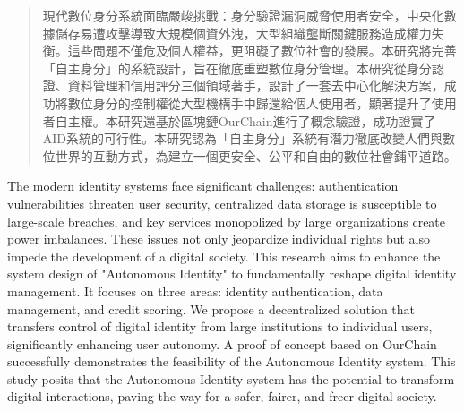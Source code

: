 
\begin{abstract}
  現代數位身分系統面臨嚴峻挑戰：身分驗證漏洞威脅使用者安全，中央化數據儲存易遭攻擊導致大規模個資外洩，大型組織壟斷關鍵服務造成權力失衡。這些問題不僅危及個人權益，更阻礙了數位社會的發展。本研究將完善「自主身分」的系統設計，旨在徹底重塑數位身分管理。本研究從身分認證、資料管理和信用評分三個領域著手，設計了一套去中心化解決方案，成功將數位身分的控制權從大型機構手中歸還給個人使用者，顯著提升了使用者自主權。本研究還基於區塊鏈OurChain進行了概念驗證，成功證實了AID系統的可行性。本研究認為「自主身分」系統有潛力徹底改變人們與數位世界的互動方式，為建立一個更安全、公平和自由的數位社會鋪平道路。
\end{abstract}

\begin{abstract*}
  The modern identity systems face significant challenges: authentication vulnerabilities threaten user security, centralized data storage is susceptible to large-scale breaches, and key services monopolized by large organizations create power imbalances. These issues not only jeopardize individual rights but also impede the development of a digital society. This research aims to enhance the system design of "Autonomous Identity" to fundamentally reshape digital identity management. It focuses on three areas: identity authentication, data management, and credit scoring. We propose a decentralized solution that transfers control of digital identity from large institutions to individual users, significantly enhancing user autonomy. A proof of concept based on OurChain successfully demonstrates the feasibility of the Autonomous Identity system. This study posits that the Autonomous Identity system has the potential to transform digital interactions, paving the way for a safer, fairer, and freer digital society.
\end{abstract*}